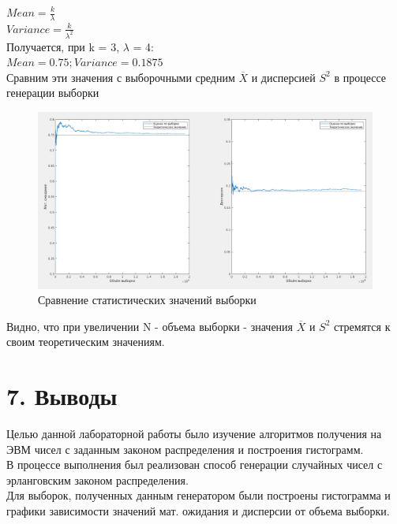 \documentclass[12pt]{article}
\begin{document}
$ Mean = \frac{k}{\lambda}$\\

$ Variance = \frac{k}{\lambda^2}$\\

Получается, при k = 3, $\lambda$ = 4:\\
	$Mean = 0.75; Variance = 0.1875$ \\
	
Сравним эти значения с выборочными средним $\overline X$ и дисперсией $S^2$ в процессе генерации выборки

\begin{figure}[!h]
	\centering
	\includegraphics[width=\linewidth]{mean_disp_graph.png}
	\caption{Сравнение статистических значений выборки}
\end{figure}

Видно, что при увеличении N - объема выборки - значения $\overline X$ и $S^2$ стремятся к своим теоретическим значениям.


\newpage
 \section*{7. Выводы}
Целью данной лабораторной работы было изучение алгоритмов получения на ЭВМ чисел с заданным законом распределения и построения гистограмм.\\

В процессе выполнения был реализован способ генерации случайных чисел с эрланговским законом распределения.\\

Для выборок, полученных данным генератором были построены гистограмма и графики зависимости значений мат. ожидания и дисперсии от объема выборки.
\end{document}
